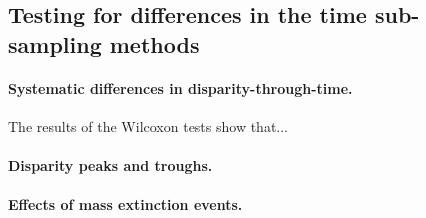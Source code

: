 \documentclass[12pt,a4paper]{article}
\begin{document}
\subsection{Testing for differences in the time sub-sampling methods}

\paragraph{Systematic differences in disparity-through-time.} 
The results of the Wilcoxon tests show that...


\paragraph{Disparity peaks and troughs.}

\paragraph{Effects of mass extinction events.}



	


	
\end{document}
